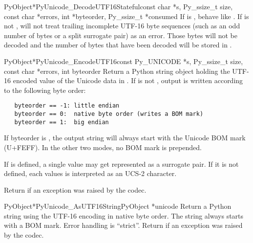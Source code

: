 \begin{cfuncdesc}{PyObject*}{PyUnicode_DecodeUTF16Stateful}{const char *s,
                                               Py_ssize_t size,
                                               const char *errors,
                                               int *byteorder,
                                               Py_ssize_t *consumed}
  If  is \NULL{}, behave like
  . If  is not \NULL{},
   will not treat trailing incomplete
  UTF-16 byte sequences (such as an odd number of bytes or a split surrogate pair)
  as an error. Those bytes will not be decoded and the number of bytes that
  have been decoded will be stored in .
\end{cfuncdesc}

\begin{cfuncdesc}{PyObject*}{PyUnicode_EncodeUTF16}{const Py_UNICODE *s,
                                               Py_ssize_t size,
                                               const char *errors,
                                               int byteorder}
  Return a Python string object holding the UTF-16 encoded value of
  the Unicode data in .  If  is not ,
  output is written according to the following byte order:

\begin{verbatim}
   byteorder == -1: little endian
   byteorder == 0:  native byte order (writes a BOM mark)
   byteorder == 1:  big endian
\end{verbatim}

  If byteorder is , the output string will always start with
  the Unicode BOM mark (U+FEFF). In the other two modes, no BOM mark
  is prepended.

  If  is defined, a single 
  value may get represented as a surrogate pair. If it is not
  defined, each  values is interpreted as an
  UCS-2 character.

  Return \NULL{} if an exception was raised by the codec.
\end{cfuncdesc}

\begin{cfuncdesc}{PyObject*}{PyUnicode_AsUTF16String}{PyObject *unicode}
  Return a Python string using the UTF-16 encoding in native byte
  order. The string always starts with a BOM mark.  Error handling is
  ``strict''.  Return \NULL{} if an exception was raised by the
  codec.
\end{cfuncdesc}

